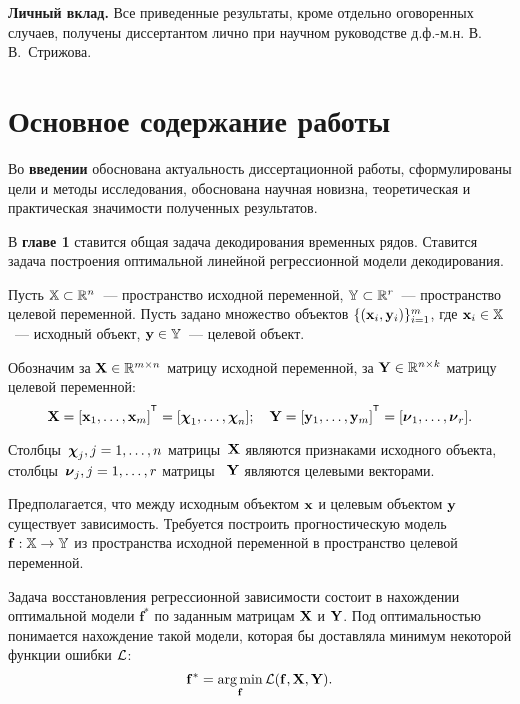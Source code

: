 \documentclass[11pt, a5paper]{dissert}
\begin{document}
\vspace{0.5cm}
\textbf{Личный вклад.}
Все приведенные результаты, кроме отдельно оговоренных случаев, получены диссертантом лично при научном руководстве д.ф.-м.н. В.\,В.~Стрижова.

\section*{Основное содержание работы}

Во \textbf{введении} обоснована актуальность диссертационной работы, сформулированы цели и методы исследования, обоснована научная новизна, теоретическая и практическая значимости полученных результатов.

В \textbf{главе 1} ставится общая задача декодирования временных рядов.
Ставится задача построения оптимальной линейной регрессионной модели декодирования.

Пусть $\mathbb{X} \subset \mathbb{R}^n$~--- пространство исходной переменной, $\mathbb{Y} \subset \mathbb{R}^r$~--- пространство целевой переменной.
Пусть задано множество объектов $\{(\mathbf{x}_i, \mathbf{y}_i)\}_{i=1}^m$, где $\mathbf{x}_i \in \mathbb{X}$~--- исходный объект, $\mathbf{y} \in \mathbb{Y}$~--- целевой объект.

Обозначим за $\mathbf{X} \in \mathbb{R}^{m \times n}$ матрицу исходной переменной, за $\mathbf{Y} \in \mathbb{R}^{n \times k}$ матрицу целевой переменной:
\begin{equation*}
	\bX = [\bx_1, \dots, \bx_m]^{\T} =  [\bchi_1, \dots, \bchi_n]; \quad \bY = [\by_1, \dots, \by_m]^{\T} =  [\bnu_1, \dots, \bnu_r].
\end{equation*}

Столбцы~$\boldsymbol{\chi}_j, j=1, \dots, n$ матрицы~$\mathbf{X}$ являются признаками исходного объекта, столбцы~$\boldsymbol{\nu}_j, j=1, \dots, r$ матрицы ~$\mathbf{Y}$ являются целевыми векторами.

Предполагается, что между исходным объектом $\mathbf{x}$ и целевым объектом $\mathbf{y}$ существует зависимость. Требуется построить прогностическую модель $\mathbf{f}: \mathbb{X} \rightarrow \mathbb{Y}$ из пространства исходной переменной в пространство целевой переменной.

Задача восстановления регрессионной зависимости состоит в нахождении оптимальной модели $\mathbf{f}^*$ по заданным матрицам $\mathbf{X}$ и $\mathbf{Y}$. Под оптимальностью понимается нахождение такой модели, которая бы доставляла минимум некоторой функции ошибки $\mathcal{L}$:
\begin{equation}
	\mathbf{f}^* = \mathop{\arg \min}\limits_\mathbf{f} \mathcal{L}(\mathbf{f}, \mathbf{X}, \mathbf{Y}).
	\label{ch1:eq:loss_min}
\end{equation}
\end{document}
